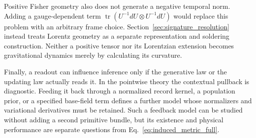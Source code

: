 Positive Fisher geometry also does not generate a negative temporal norm. Adding a gauge-dependent term $\operatorname{tr}(U^{-1}dU\otimes U^{-1}dU)$ would replace this problem with an arbitrary frame choice. Section~\ref{sec:signature_resolution} instead treats Lorentz geometry as a separate representation and soldering construction. Neither a positive tensor nor its Lorentzian extension becomes gravitational dynamics merely by calculating its curvature.

Finally, a readout can influence inference only if the generative law or the updating law actually reads it. In the pointwise theory the contextual pullback is diagnostic. Feeding it back through a normalized record kernel, a population prior, or a specified base-field term defines a further model whose normalizers and variational derivatives must be retained. Such a feedback model can be studied without adding a second primitive bundle, but its existence and physical performance are separate questions from Eq.~\eqref{eq:induced_metric_full}.
